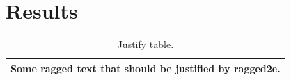\documentclass{article}
\begin{document}
\section{Results}
\begin{table}
\centering
\caption{Justify table.}
\label{tab:justify}
\begin{tabular}{>{\justify}p{4cm}}
\toprule
Some ragged text that should be justified by ragged2e. \tabularnewline
\bottomrule
\end{tabular}
\end{table}
\end{document}

